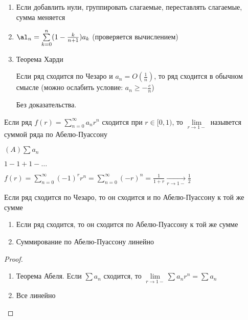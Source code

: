 \begin{observation}
    \leavevmode
    \begin{enumerate}
        \item Если добавлить нули, группировать слагаемые, переставлять слагаемые, сумма меняется
        \item $\al_n = \sum\limits_{k=0}^n(1 - \frac{k}{n+1})a_k$ (проверяется вычислением)
        \item Теорема Харди
        
              Если ряд сходится по Чезаро и $a_n = O(\frac{1}{n})$, то ряд сходится в обычном смысле (можно ослабить условие: $a_n \geq -\frac{c}{n}$)
              
              Без доказательства.
    \end{enumerate}
\end{observation}

\begin{definition}
    Если ряд $f(r) = \sum\limits_{n = 0}^\infty a_nr^n$ сходится при $r \in [0, 1)$, то $\lim\limits_{r \to 1-}$ назывется суммой ряда по Абелю-Пуассону
\end{definition}

\begin{designation}
    $(A)\sum a_n$
\end{designation}

\begin{example}
    $1 - 1 + 1 - \ldots $
    
    $f(r) = \sum\limits_{n =0}^\infty (-1)^rr^n = \sum\limits_{n = 0}^\infty (-r)^n = \frac{1}{1 + r} \xrightarrow[r \to 1-]{} \frac{1}{2}$
\end{example}

\begin{observation}
    Если ряд сходится по Чезаро, то он сходится и по Абелю-Пуассону к той же сумме
\end{observation}

\begin{theorem}
    \leavevmode
    \begin{enumerate}
        \item Если ряд сходится, то он сходится по Абелю-Пуассону к той же сумме
        \item Суммирование по Абелю-Пуассону линейно
    \end{enumerate}
\end{theorem}

\begin{proof}
    \leavevmode
    \begin{enumerate}
        \item Теорема Абеля. Если $\sum a_n$ сходится, то $\lim\limits_{r \to 1-} \sum a_nr^n = \sum a_n$
        \item Все линейно
    \end{enumerate}
\end{proof}

